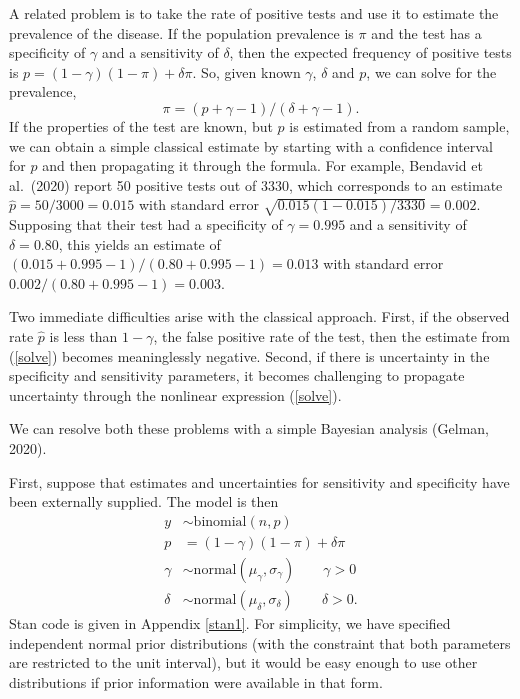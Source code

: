 \documentclass[11pt]{article}
\begin{document}
A related problem is to take the rate of positive tests and use it to estimate the prevalence of the disease.  If the population prevalence is $\pi$ and the test has a specificity of $\gamma$ and a sensitivity of $\delta$, then the expected frequency of positive tests is $p=(1-\gamma)(1- \pi)+ \delta\pi$.  So, given known $\gamma$, $\delta$ and $p$, we can solve for the prevalence,
\begin{equation}\label{solve}
  \pi=(p + \gamma - 1)/(\delta + \gamma - 1).
  \end{equation}
  If the properties of the test are known, but $p$ is estimated from a random sample, we can obtain a simple classical estimate by starting with a confidence interval for $p$ and then propagating it through the formula.  For example, Bendavid et al.\ (2020) report 50 positive tests out of 3330, which corresponds to an estimate  $\hat{p}=50/3000=0.015$ with standard error $\sqrt{0.015(1-0.015)/3330}=0.002$.  Supposing that their test had a specificity of $\gamma=0.995$ and a sensitivity of $\delta=0.80$, this yields an estimate of $(0.015 + 0.995 - 1)/(0.80 + 0.995 -1) = 0.013$ with standard error $0.002/(0.80 + 0.995 -1) = 0.003$.

 Two immediate difficulties arise with the classical approach.  First, if the observed rate $\hat{p}$ is less than  $1-\gamma$, the false positive rate of the test, then the estimate from (\ref{solve}) becomes meaninglessly negative.  Second, if there is uncertainty in the specificity and sensitivity parameters, it becomes challenging to propagate uncertainty through the nonlinear expression (\ref{solve}).

We can resolve both these problems with a simple Bayesian analysis (Gelman, 2020).

First, suppose that estimates and uncertainties for sensitivity and specificity have been externally supplied.  The model is then
\begin{align}
\nonumber  y & \sim \mbox{binomial} (n, p) \\
\nonumber   p & = (1-\gamma)(1- \pi)+ \delta\pi \\
\nonumber  \gamma & \sim \mbox{normal}(\mu_{\gamma}, \sigma_{\gamma}) \qquad \gamma > 0 \\
\label{normals}  \delta & \sim \mbox{normal}(\mu_{\delta}, \sigma_{\delta}) \qquad \delta > 0.
\end{align}
Stan code is given in Appendix \ref{stan1}.
For simplicity, we have specified independent normal prior distributions (with the constraint that both parameters are restricted to the unit interval), but it would be easy enough to use other distributions if prior information were available in that form.
\end{document}
